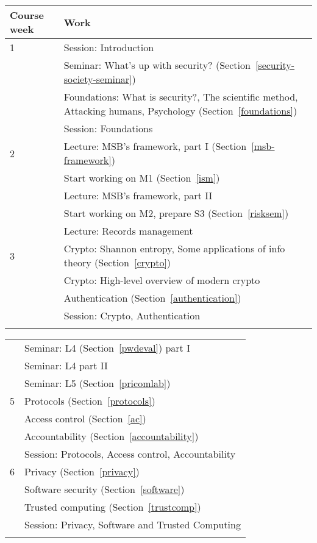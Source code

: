 	\centering
  \begin{tabular}{lp{9cm}}
    \toprule
    \textbf{Course week}	& \textbf{Work} \\
    \midrule
    1
      & Session: Introduction\\
      & Seminar: What's up with security? (Section~\ref{security-society-seminar})\\
      & Foundations: What is security?, The scientific method, Attacking 
      humans, Psychology (Section~\ref{foundations})\\
      & Session: Foundations\\
    \midrule
    2
      & Lecture: MSB's framework, part I (Section~\ref{msb-framework})\\
      & Start working on M1 (Section~\ref{ism})\\
      & Lecture: MSB's framework, part II\\
      & Start working on M2, prepare S3 (Section~\ref{risksem})\\
      & Lecture: Records management\\
    \midrule
    3
      & Crypto: Shannon entropy, Some applications of info theory 
      (Section~\ref{crypto})\\
      & Crypto: High-level overview of modern crypto\\
      & Authentication (Section~\ref{authentication})\\
      & Session: Crypto, Authentication\\
    \midrule
\mode<presentation>{%
  \end{tabular}
  \begin{tabular}{lp{9cm}}
}%
    4
      & Seminar: L4 (Section~\ref{pwdeval}) part I\\
      & Seminar: L4 part II\\
      & Seminar: L5 (Section~\ref{pricomlab})\\
    \midrule
    5
      & Protocols (Section~\ref{protocols})\\
      & Access control (Section~\ref{ac})\\
      & Accountability (Section~\ref{accountability})\\
      & Session: Protocols, Access control, Accountability\\
    \midrule
    6
      & Privacy (Section~\ref{privacy})\\
      & Software security (Section~\ref{software})\\
      & Trusted computing (Section~\ref{trustcomp})\\
      & Session: Privacy, Software and Trusted Computing\\
    \midrule
\mode<presentation>{%
  \end{tabular}
